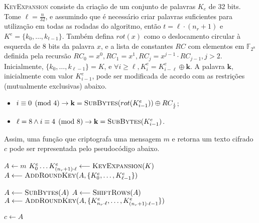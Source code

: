 \documentclass{article}
\begin{document}
\textsc{KeyExpansion} consiste da criação de um conjunto de palavras $K_e$ de 32 bits.
Tome $\ell = \frac{n}{32}$, e assumindo que é necessário criar palavras suficientes para utilização em todas as rodadas do algoritmo, então $t = \ell \cdot (n_r + 1)$ e $K^e = \{k_0, \dots, k_{t - 1}\}$. Também defina $rot(x)$ como o deslocamento circular à esquerda de 8 bits da palavra $x$, e a lista de constantes $RC$ com elementos em $\mathbb{F}_{2^{8}}$ definida pela recursão $RC_0 = x^0, RC_1 = x^1, RC_j = x^{j-1} \cdot RC_{j-1}, j > 2$. Inicialmente, $\{k_0, \dots, k_{\ell - 1}\} = K$, e $\forall i \geq \ell, K^{e}_{i} = K^{e}_{i - \ell} \oplus \mathbf{k}$. A palavra $\mathbf{k}$, inicialmente com valor $K^{e}_{i - 1}$, pode ser modificada de acordo com as restrições (mutualmente exclusivas) abaixo.

\begin{itemize}
    \item $i \equiv 0 \pmod{4} \rightarrow \mathbf{k}
        = \textsc{SubBytes}(rot(K^{e}_{i - 1})) \oplus RC_{\frac{i}{\ell}}$;
    \item $\ell = 8 \land i \equiv 4 \pmod{8} \rightarrow \mathbf{k}
        = \textsc{SubBytes}(K^{e}_{i - 1})$.
\end{itemize}

Assim, uma função que criptografa uma mensagem $m$ e retorna um texto cifrado $c$ pode ser
representada pelo pseudocódigo abaixo.

\begin{algorithm}[H]

    $A \longleftarrow m$\;
    $K^{e}_{0} \dots K^{e}_{(n_r + 1) \cdot \ell}
        \longleftarrow \textsc{KeyExpansion}(K)$\;
    $A \longleftarrow \textsc{AddRoundKey}(A,
        \{K^{e}_{0}, \dots, K^{e}_{\ell - 1}\})$\;
    
 
    $A \longleftarrow \textsc{SubBytes}(A)$\;
    $A \longleftarrow \textsc{ShiftRows}(A)$\;
    $A \longleftarrow \textsc{AddRoundKey}(A,
        \{K^{e}_{n_r \cdot \ell}, \dots, K^{e}_{(n_r + 1) \cdot \ell - 1}\})$\;

    $c \longleftarrow A$\;
\end{algorithm}
\end{document}
